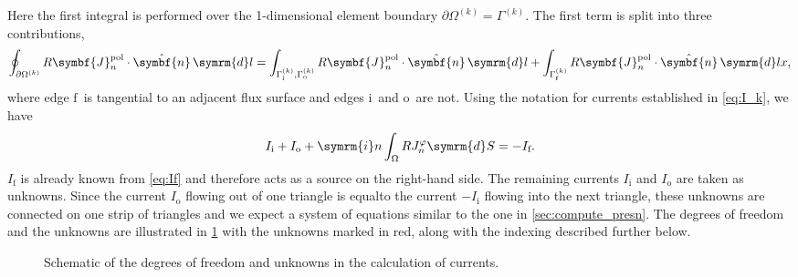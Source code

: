\documentclass[a4paper, twoside, 10pt, english]{article}
\numberwithin{equation}{section}
\let\temp\varrho
\let\varrho\rho
\let\rho\temp
\let\temp\vartheta
\let\vartheta\theta
\let\theta\temp
\let\temp\varphi
\let\varphi\phi
\let\phi\temp
\let\vec\symbf
\newcommand*\diff{\ensuremath{\symrm{d}}}  %
\newcommand*\im{\ensuremath{\symrm{i}}}  %
\newcommand*\pol{\ensuremath{\textrm{pol}}}  %
\newcommand*\fs{\ensuremath{\textrm{f}}}  %
\newcommand*\inw{\ensuremath{\textrm{i}}}  %
\newcommand*\out{\ensuremath{\textrm{o}}}  %
\begin{document}
Here the first integral is performed over the 1-dimensional element boundary $\partial \Omega^{(k)} = \Gamma^{(k)}$. The first term is split into three contributions,
\begin{gather}
  \oint_{\partial \Omega^{(k)}} R \vec{J}_{n}^{\pol} \cdot \hat{\vec{n}} \, \diff l = \int_{\Gamma_{\inw}^{(k)}, \Gamma_{\out}^{(k)}} R \vec{J}_{n}^{\pol} \cdot \hat{\vec{n}} \, \diff l + \int_{\Gamma_{\fs}^{(k)}} R \vec{J}_{n}^{\pol} \cdot \hat{\vec{n}} \, \diff lx,
\end{gather}
where edge \fs\ is tangential to an adjacent flux surface and edges \inw\ and \out\ are not. Using the notation for currents established in \cref{eq:I_k}, we have
\begin{gather}
  I_{\inw} + I_{\out} + \im n \int_{\Omega} R J_{n}^{\phi} \diff S = -I_{\fs}.
\end{gather}
 $I_{\fs}$ is already known from \cref{eq:If} and therefore acts as a source on the right-hand side. The remaining currents $I_{\inw}$ and $I_{\out}$ are taken as unknowns. Since the current $I_{\out}$ flowing out of one triangle is equalto the current $-I_{\inw}$ flowing into the next triangle, these unknowns are connected on one strip of triangles and we expect a system of equations similar to the one in \cref{sec:compute_presn}. The degrees of freedom and the unknowns are illustrated in \cref{fig:current_perturbation} with the unknowns marked in red, along with the indexing described further below. 
\begin{figure}[bth]
  \centering
  
  \caption{Schematic of the degrees of freedom and unknowns in the calculation of currents.}
  \label{fig:current_perturbation}
\end{figure}
\end{document}
